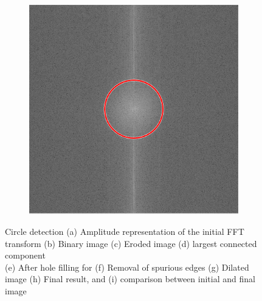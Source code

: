 \documentclass{article}
\begin{document}
\begin{figure}[H]
\begin{subfigure}[b]{0.32\textwidth}
		\caption{}
		\label{fig:step8lpf}
	\end{subfigure}%
	\hspace{\fill}
	\begin{subfigure}[b]{0.32\textwidth}
		\includegraphics[width=\linewidth]{step9}
		\caption{}
		\label{fig:step9lpf}
	\end{subfigure}
	\caption{Circle detection (a) Amplitude representation of the initial FFT \\transform
		(b) Binary image
		(c) Eroded image (d) largest connected component \\
		(e) After hole filling for (f) Removal of spurious edges
		(g) Dilated image (h) Final result, and (i) comparison between initial and final image}\label{fig:lowpass}
\end{figure}
\end{document}
